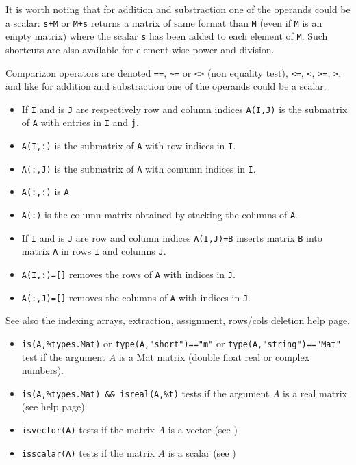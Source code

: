 It is worth noting that for addition and substraction one of the operands could be a scalar:
\verb=s+M= or \verb=M+s= returns a matrix of same format than \verb+M+
(even if \verb+M+ is an empty matrix) where the scalar \verb=s= has been added to each
element of \verb+M+. Such shortcuts are also available for element-wise power and division. 

Comparizon operators are denoted \verb+==+, \verb+~=+ or  \verb+<>+ (non equality test), 
\verb+<=+, \verb+<+, \verb+>=+, \verb+>+, and like for  addition and substraction one of
the operands could be a scalar. 

\begin{itemize}
   \item If \verb+I+ and is \verb+J+ are respectively row and column indices \verb+A(I,J)+ is the submatrix of \verb+A+ with entries in \verb+I+ and \verb+j+.
   \item \verb+A(I,:)+ is the submatrix of \verb+A+ with row indices in \verb+I+.
   \item \verb+A(:,J)+ is the submatrix of \verb+A+ with comumn indices in \verb+I+.
   \item \verb+A(:,:)+ is \verb+A+
   \item \verb+A(:)+  is the column matrix obtained by stacking the columns of \verb+A+.
\end{itemize}
\begin{itemize}
   \item If \verb+I+ and is \verb+J+ are row and column indices \verb+A(I,J)=B+ inserts
matrix \verb+B+ into matrix \verb+A+ in rows \verb+I+ and columns \verb!J!.
   \item \verb+A(I,:)=[]+ removes the rows of \verb+A+ with indices in \verb+J+.
   \item \verb+A(:,J)=[]+ removes the columns of \verb+A+ with indices in \verb+J+.
\end{itemize}
See also the \hyperlink{indexing arrays}{indexing arrays, extraction, assignment, rows/cols deletion} help page.

\begin{itemize}
    \item \verb+is(A,%types.Mat)+ or \verb+type(A,"short")=="m"+ or \verb+type(A,"string")=="Mat"+ 
     test if the argument $A$ is a Mat matrix (double float real or complex numbers).
    \item \verb+is(A,%types.Mat) && isreal(A,%t)+ tests if the argument $A$ is a real matrix (see
                      help page).
    \item \verb+isvector(A)+ tests if the matrix $A$ is a vector (see )
    \item \verb+isscalar(A)+ tests if the matrix $A$ is a scalar (see )
\end{itemize}

